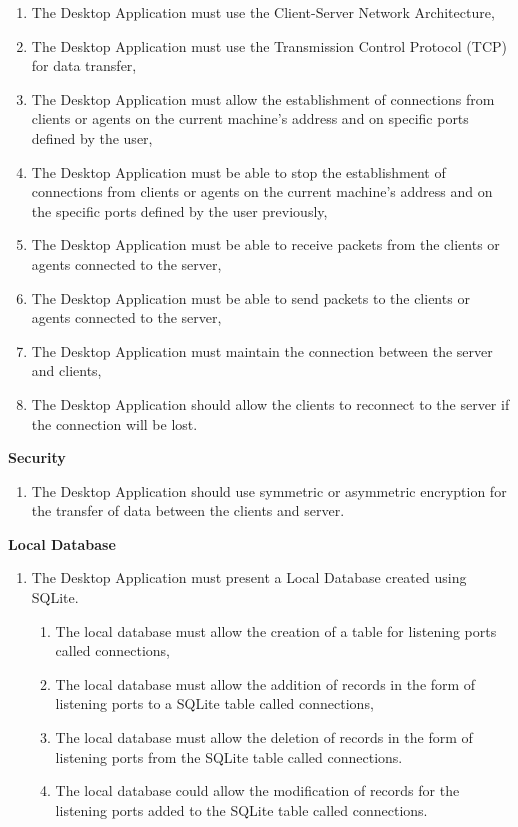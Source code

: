 \begin{enumerate}
    \item The Desktop Application must use the Client-Server Network Architecture,
    \item The Desktop Application must use the Transmission Control Protocol (TCP) for data transfer,
    \item The Desktop Application must allow the establishment of connections from clients or agents on the
          current machine's address and on specific ports defined by the user,
    \item The Desktop Application must be able to stop the establishment of connections from clients or agents
          on the current machine's address and on the specific ports defined by the user previously,
    \item The Desktop Application must be able to receive packets from the clients or agents connected
          to the server,
    \item The Desktop Application must be able to send packets to the clients or agents connected to the server,
    \item The Desktop Application must maintain the connection between the server and clients,
    \item The Desktop Application should allow the clients to reconnect to the server if the
          connection will be lost.
\end{enumerate}

\noindent
\textbf{Security}

\begin{enumerate}
    \item The Desktop Application should use symmetric or asymmetric encryption for the transfer of
          data between the clients and server.
\end{enumerate}

\noindent
\textbf{Local Database}

\begin{enumerate}
    \item The Desktop Application must present a Local Database created using SQLite.
    \begin{enumerate}
        \item The local database must allow the creation of a table for listening ports called connections,
        \item The local database must allow the addition of records in the form of listening ports to a SQLite
        table called connections,
        \item The local database must allow the deletion of records in the form of listening ports from the SQLite
        table called connections.
        \item The local database could allow the modification of records for the listening ports added to the
        SQLite table called connections.
    \end{enumerate}
\end{enumerate}

